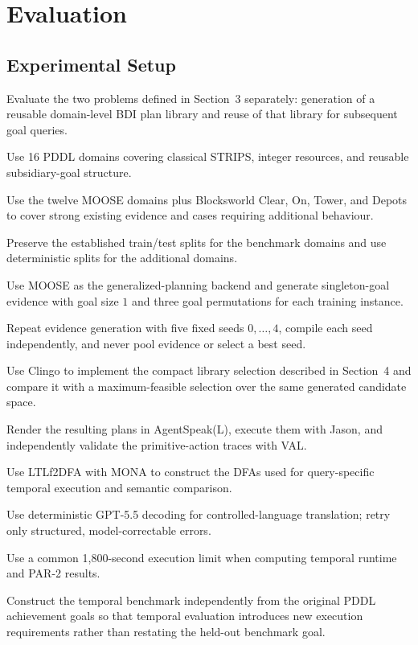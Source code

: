 \section{Evaluation}

\subsection{Experimental Setup}

Evaluate the two problems defined in Section~3 separately: generation of a reusable domain-level BDI plan library and reuse of that library for subsequent goal queries.

Use 16 PDDL domains covering classical STRIPS, integer resources, and
reusable subsidiary-goal structure.

Use the twelve MOOSE domains plus Blocksworld Clear, On, Tower, and Depots to
cover strong existing evidence and cases requiring additional behaviour.

Preserve the established train/test splits for the benchmark domains and use deterministic splits for the additional domains.

Use MOOSE as the generalized-planning backend and generate singleton-goal evidence with goal size \(1\) and three goal permutations for each training instance.

Repeat evidence generation with five fixed seeds \(0,\ldots,4\), compile each seed independently, and never pool evidence or select a best seed.

Use Clingo to implement the compact library selection described in Section~4 and compare it with a maximum-feasible selection over the same generated candidate space.

Render the resulting plans in AgentSpeak(L), execute them with Jason, and independently validate the primitive-action traces with VAL.

Use LTLf2DFA with MONA to construct the DFAs used for query-specific temporal execution and semantic comparison.

Use deterministic GPT-5.5 decoding for controlled-language translation; retry
only structured, model-correctable errors.

Use a common 1,800-second execution limit when computing temporal runtime and PAR-2 results.

Construct the temporal benchmark independently from the original PDDL achievement goals so that temporal evaluation introduces new execution requirements rather than restating the held-out benchmark goal.

